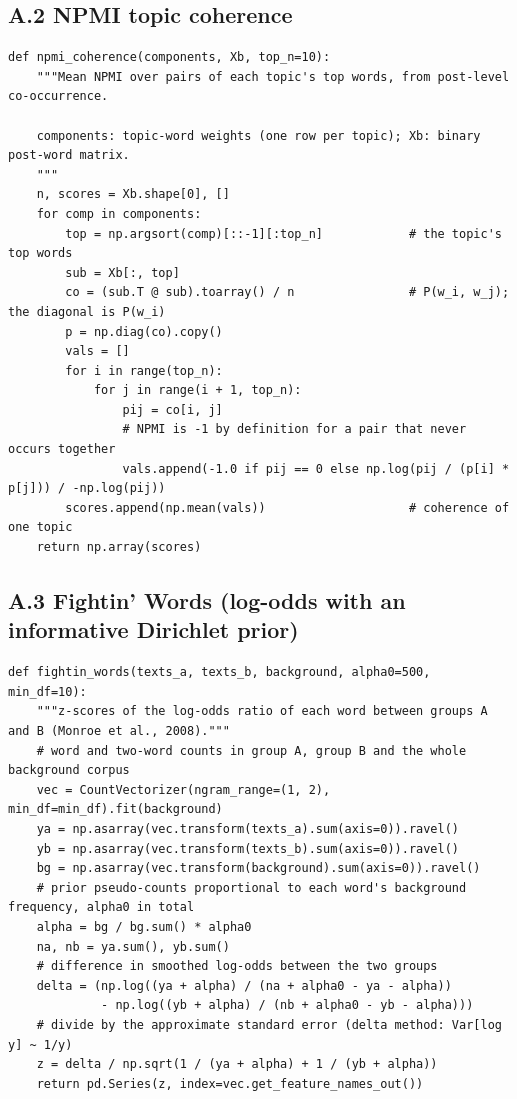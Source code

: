 \documentclass[11pt,a4paper]{article}
\begin{document}
\subsection*{A.2 NPMI topic coherence}
\vspace{4pt}
\begin{lstlisting}
def npmi_coherence(components, Xb, top_n=10):
    """Mean NPMI over pairs of each topic's top words, from post-level co-occurrence.

    components: topic-word weights (one row per topic); Xb: binary post-word matrix.
    """
    n, scores = Xb.shape[0], []
    for comp in components:
        top = np.argsort(comp)[::-1][:top_n]            # the topic's top words
        sub = Xb[:, top]
        co = (sub.T @ sub).toarray() / n                # P(w_i, w_j); the diagonal is P(w_i)
        p = np.diag(co).copy()
        vals = []
        for i in range(top_n):
            for j in range(i + 1, top_n):
                pij = co[i, j]
                # NPMI is -1 by definition for a pair that never occurs together
                vals.append(-1.0 if pij == 0 else np.log(pij / (p[i] * p[j])) / -np.log(pij))
        scores.append(np.mean(vals))                    # coherence of one topic
    return np.array(scores)
\end{lstlisting}

\subsection*{A.3 Fightin' Words (log-odds with an informative Dirichlet prior)}
\vspace{4pt}
\begin{lstlisting}
def fightin_words(texts_a, texts_b, background, alpha0=500, min_df=10):
    """z-scores of the log-odds ratio of each word between groups A and B (Monroe et al., 2008)."""
    # word and two-word counts in group A, group B and the whole background corpus
    vec = CountVectorizer(ngram_range=(1, 2), min_df=min_df).fit(background)
    ya = np.asarray(vec.transform(texts_a).sum(axis=0)).ravel()
    yb = np.asarray(vec.transform(texts_b).sum(axis=0)).ravel()
    bg = np.asarray(vec.transform(background).sum(axis=0)).ravel()
    # prior pseudo-counts proportional to each word's background frequency, alpha0 in total
    alpha = bg / bg.sum() * alpha0
    na, nb = ya.sum(), yb.sum()
    # difference in smoothed log-odds between the two groups
    delta = (np.log((ya + alpha) / (na + alpha0 - ya - alpha))
             - np.log((yb + alpha) / (nb + alpha0 - yb - alpha)))
    # divide by the approximate standard error (delta method: Var[log y] ~ 1/y)
    z = delta / np.sqrt(1 / (ya + alpha) + 1 / (yb + alpha))
    return pd.Series(z, index=vec.get_feature_names_out())
\end{lstlisting}
\end{document}
